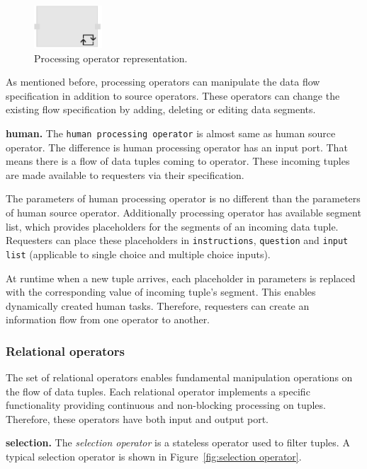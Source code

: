 \begin{figure}[ht]
	\centering
	\includegraphics[height=60px]{figures/ProcessingOperator.pdf}
	\caption{Processing operator representation.}
	\label{fig:processing operator}
\end{figure}

As mentioned before, processing operators can manipulate the data flow specification 
in addition to source operators. These operators can change the existing flow specification 
by adding, deleting or editing data segments.

\textbf{human.}
The \texttt{human processing operator} is almost same as human source operator. 
The difference is human processing operator has an input port. That means there is a 
flow of data tuples coming to operator. These incoming tuples are made available 
to requesters via their specification.

The parameters of human processing operator is no different than the parameters of 
human source operator. Additionally processing operator has available segment list, which 
provides placeholders for the segments of an incoming data tuple. Requesters can place 
these placeholders in \texttt{instructions}, \texttt{question} and \texttt{input list} 
(applicable to single choice and multiple choice inputs).

At runtime when a new tuple arrives, each placeholder in parameters is replaced with 
the corresponding value of incoming tuple's segment. This enables dynamically created human 
tasks. Therefore, requesters can create an information flow from one operator to another.

\subsubsection{Relational operators}
The set of relational operators enables fundamental manipulation operations on 
the flow of data tuples. Each relational operator implements a specific functionality 
providing continuous and non-blocking processing on tuples. Therefore, these operators 
have both input and output port.

\textbf{selection.}
The \textit{selection operator} is a stateless operator used to filter tuples. A typical 
selection operator is shown in Figure~\ref{fig:selection operator}.

